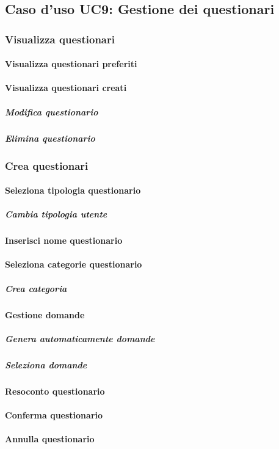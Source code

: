 \subsection{Caso d'uso UC9: Gestione dei questionari}

	\subsubsection{Visualizza questionari}
		\paragraph{Visualizza questionari preferiti}
		\paragraph{Visualizza questionari creati}
			\subparagraph{Modifica questionario}
			\subparagraph{Elimina questionario}
	\subsubsection{Crea questionari}
		\paragraph{Seleziona tipologia questionario}
			\subparagraph{Cambia tipologia utente}
		\paragraph{Inserisci nome questionario}
		\paragraph{Seleziona categorie questionario}
			\subparagraph{Crea categoria}
		\paragraph{Gestione domande}
			\subparagraph{Genera automaticamente domande}
			\subparagraph{Seleziona domande}	
		\paragraph{Resoconto questionario}
		\paragraph{Conferma questionario}
		\paragraph{Annulla questionario}